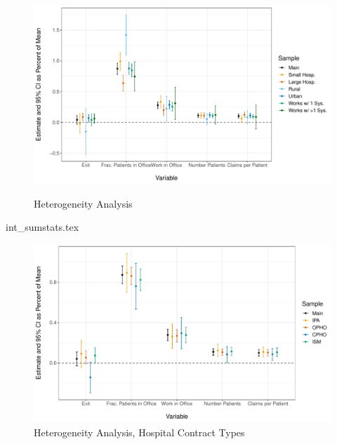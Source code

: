 \documentclass[12pt]{article}
\begin{document}
\begin{figure}
    \centering
    \caption{Heterogeneity Analysis}
    \includegraphics[scale=.6]{Objects/heterog_plot.pdf}
    \label{fig:heter}
\end{figure}

{int_sumstats.tex}

\begin{figure}
    \centering
    \caption{Heterogeneity Analysis, Hospital Contract Types}
    \includegraphics[scale=.6]{Objects/heterog_plot_int.pdf}
\end{figure}
\end{document}
